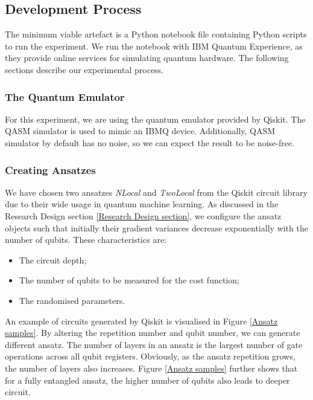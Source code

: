 \subsection{Development Process} \label{Development Process section}
The minimum viable artefact is a Python notebook file containing Python scripts to run the experiment.
We run the notebook with IBM Quantum Experience, as they provide online services for simulating quantum hardware.
The following sections describe our experimental process.

\subsubsection{The Quantum Emulator}
For this experiment, we are using the quantum emulator provided by Qiskit.
The QASM simulator is used to mimic an IBMQ device.
Additionally, QASM simulator by default has no noise, so we can expect the result to be noise-free.

\subsubsection{Creating Ansatzes}
We have chosen two ansatzes \textit{NLocal} and \textit{TwoLocal} from the Qiskit circuit library due to their wide usage in quantum machine learning.
As discussed in the Research Design section \ref{Research Design section}, we configure the ansatz objects such that initially their gradient variances decrease exponentially with the number of qubits.
These characteristics are:
\begin{itemize}
    \item The circuit depth;
    \item The number of qubits to be measured for the cost function;
    \item The randomised parameters.
\end{itemize}

An example of circuits generated by Qiskit is visualised in Figure \ref{Ansatz samples}.
By altering the repetition number and qubit number, we can generate different ansatz.
The number of layers in an ansatz is the largest number of gate operations across all qubit registers.
Obviously, as the ansatz repetition grows, the number of layers also increases.
Figure \ref{Ansatz samples} further shows that for a fully entangled ansatz, the higher number of qubits also leads to deeper circuit.

